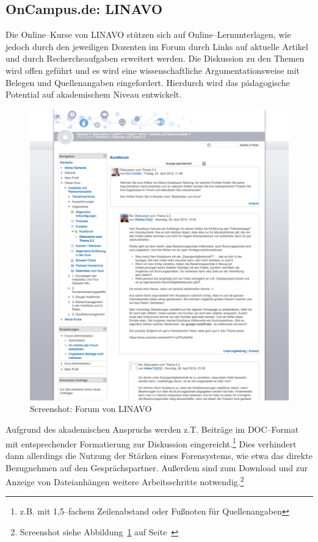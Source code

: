 
\subsection{OnCampus.de: LINAVO} %
\label{sub:oncampus_de}

Die Online–Kurse von \ac{LINAVO} stützen sich auf Online–Lernunterlagen, wie jedoch durch den jeweiligen Dozenten im Forum durch Links auf aktuelle Artikel und durch Rechercheaufgaben erweitert werden. Die Diskussion zu den Themen wird offen geführt und es wird eine wissenschaftliche Argumentationsweise mit Belegen und Quellenangaben eingefordert. Hierdurch wird das pädagogische Potential auf akademischem Niveau entwickelt.

\begin{figure}[p]
\begin{center}
\includegraphics[width=\textwidth]{linavo.jpg}
\caption{Screenshot: Forum von LINAVO}
\label{fig:linavo}
\end{center}
\end{figure}

Aufgrund des akademischen Anspruchs werden z.T. Beiträge im DOC–Format mit entsprechender Formatierung zur Diskussion eingereicht.\footnote{z.B. mit 1,5–fachem Zeilenabstand oder Fußnoten für Quellenangaben} Dies verhindert dann allerdings die Nutzung der Stärken eines Forensystems, wie etwa das direkte Bezugnehmen auf den Gesprächspartner. Außerdem sind zum Download und zur Anzeige von Dateianhängen weitere Arbeitsschritte notwendig.\footnote{Screenshot siehe Abbildung~\ref{fig:linavo} auf Seite~\pageref{fig:linavo}}

